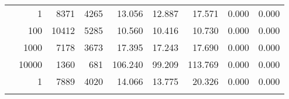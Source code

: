 \begin{table}
\begin{tabular}{rrrrrrrrr}
	            
	        
				\noalign{\smallskip}\hline
				\multirow{ 4 }{*}{ 80000 } &
				
					
					 
					\multirow{ 1 }{*}{ 1 } &
					
						
							    
							     8371  & 4265  
	                           & 13.056 & 12.887 & 17.571
	                           & 0.000 & 0.000  \\
	                
	            
					 &  
					 
					\multirow{ 1 }{*}{ 100 } &
					
						
							    
							     10412  & 5285  
	                           & 10.560 & 10.416 & 10.730
	                           & 0.000 & 0.000  \\
	                
	            
					 &  
					 
					\multirow{ 1 }{*}{ 1000 } &
					
						
							    
							     7178  & 3673  
	                           & 17.395 & 17.243 & 17.690
	                           & 0.000 & 0.000  \\
	                
	            
					 &  
					 
					\multirow{ 1 }{*}{ 10000 } &
					
						
							    
							     1360  & 681  
	                           & 106.240 & 99.209 & 113.769
	                           & 0.000 & 0.000  \\
	                
	            
	        
				\noalign{\smallskip}\hline
				\multirow{ 4 }{*}{ 160000 } &
				
					
					 
					\multirow{ 1 }{*}{ 1 } &
					
						
							    
							     7889  & 4020  
	                           & 14.066 & 13.775 & 20.326
	                           & 0.000 & 0.000  \\
	                
	            
					 &  
					 

\end{tabular}
\end{table}
